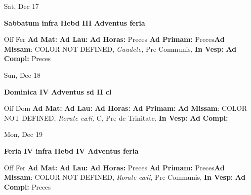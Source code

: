 \documentclass[10pt]{memoir}
\begin{document}
\begin{center}
\begin{minipage}{3.5in}
\vspace{2em}
\begin{center}Sat, Dec 17
\end{center}
\textbf{ \large Sabbatum infra Hebd III Adventus
\textnormal{\normalsize feria}}

\begin{justify}Off Fer
\textbf{Ad Mat: }
\textbf{Ad Lau: }
\textbf{Ad Horas: }Preces
\textbf{Ad Primam: }Preces\textbf{Ad Missam}: COLOR NOT DEFINED, \textit{Gaudete,} Pre Communis, 
\textbf{In Vesp: }
\textbf{Ad Compl: }Preces
\end{justify}
\end{minipage}
\end{center}

\begin{center}
\begin{minipage}{3.5in}
\vspace{2em}
\begin{center}Sun, Dec 18
\end{center}
\textbf{ \large Dominica IV Adventus
\textnormal{\normalsize sd II cl}}

\begin{justify}Off Dom
\textbf{Ad Mat: }
\textbf{Ad Lau: }
\textbf{Ad Horas: }
\textbf{Ad Primam: }\textbf{Ad Missam}: COLOR NOT DEFINED, \textit{Rorate cæli,} C, Pre de Trinitate, 
\textbf{In Vesp: }
\textbf{Ad Compl: }
\end{justify}
\end{minipage}
\end{center}

\begin{center}
\begin{minipage}{3.5in}
\vspace{2em}
\begin{center}Mon, Dec 19
\end{center}
\textbf{ \large Feria IV infra Hebd IV Adventus
\textnormal{\normalsize feria}}

\begin{justify}Off Fer
\textbf{Ad Mat: }
\textbf{Ad Lau: }
\textbf{Ad Horas: }Preces
\textbf{Ad Primam: }Preces\textbf{Ad Missam}: COLOR NOT DEFINED, \textit{Rorate cæli,} Pre Communis, 
\textbf{In Vesp: }
\textbf{Ad Compl: }Preces
\end{justify}
\end{minipage}
\end{center}
\end{document}

